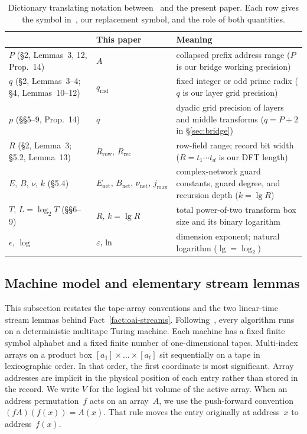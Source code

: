 \begin{table}[htbp]
\centering\small
\caption{Dictionary translating notation between~\cite{OAI26} and the present paper. Each row gives the symbol in~\cite{OAI26}, our replacement symbol, and the role of both quantities.}\label{tab:oai-renaming}
\begin{tabular}{@{}>{\raggedright}p{4.0cm}>{\raggedright}p{3.4cm}>{\raggedright\arraybackslash}p{8.1cm}@{}}
\toprule
\cite{OAI26} & This paper & Meaning\\
\midrule
$P$ (\S2, Lemmas~3, 12, Prop.~14) & $A$ & collapsed prefix address range ($P$ is our bridge working precision)\\
$q$ (\S2, Lemmas~3--4; \S4, Lemmas~10--12) & $q_{\mathrm{rad}}$ & fixed integer or odd prime radix ($q$ is our layer grid precision)\\
$p$ (\S\S5--9, Prop.~14) & $q$ & dyadic grid precision of layers and middle transforms ($q=P+2$ in \S\ref{sec:bridge})\\
$R$ (\S2, Lemma~3; \S5.2, Lemma~13) & $R_{\mathrm{row}},\,R_{\mathrm{rec}}$ & row-field range; record bit width ($R=t_1\cdots t_d$ is our DFT length)\\
$E,\,B,\,\nu,\,k$ (\S5.4) & $E_{\mathrm{net}},\,B_{\mathrm{net}},\,\nu_{\mathrm{net}},\,j_{\max}$ & complex-network guard constants, guard degree, and recursion depth ($k=\lg R$)\\
$T,\,L=\log_2T$ (\S\S6--9) & $R,\,k=\lg R$ & total power-of-two transform box size and its binary logarithm\\
$\epsilon,\,\log$ & $\varepsilon,\,\ln$ & dimension exponent; natural logarithm ($\lg=\log_2$)\\
\bottomrule
\end{tabular}
\end{table}

\subsection{Machine model and elementary stream lemmas}\label{sec:prelim-oai-model}

This subsection restates the tape-array conventions and the two linear-time stream lemmas behind Fact~\ref{fact:oai-streams}. Following~\cite[\S2]{OAI26}, every algorithm runs on a deterministic multitape Turing machine. Each machine has a fixed finite symbol alphabet and a fixed finite number of one-dimensional tapes. Multi-index arrays on a product box $[a_1]\times\dots\times[a_t]$ sit sequentially on a tape in lexicographic order. In that order, the first coordinate is most significant. Array addresses are implicit in the physical position of each entry rather than stored in the record. We write $V$ for the logical bit volume of the active array. When an address permutation~$f$ acts on an array~$A$, we use the push-forward convention $(fA)(f(x))=A(x)$. That rule moves the entry originally at address~$x$ to address~$f(x)$.

